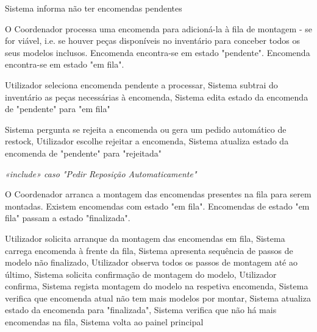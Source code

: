             {
                Sistema informa não ter encomendas pendentes
            }

            \newpage
                {O Coordenador processa uma encomenda para adicioná-la à fila de montagem - se for viável, i.e. se houver peças disponíveis no inventário para conceber todos os seus modelos inclusos.}
                {Encomenda encontra-se em estado "pendente".}
                {Encomenda encontra-se em estado "em fila".}

            {
                Utilizador seleciona encomenda pendente a processar,
                Sistema subtrai do inventário as peças necessárias à encomenda,
                Sistema edita estado da encomenda de "pendente" para "em fila"
            }

            {
                Sistema pergunta se rejeita a encomenda ou gera um pedido automático de restock,
                Utilizador escolhe rejeitar a encomenda,
                Sistema atualiza estado da encomenda de "pendente" para "rejeitada"
            }

            {
               \textit{«include» caso "Pedir Reposição Automaticamente"}
            }

            \newpage
                {O Coordenador arranca a montagem das encomendas presentes na fila para serem montadas.}
                {Existem encomendas com estado "em fila".}
                {Encomendas de estado "em fila" passam a estado "finalizada".}

            {
                Utilizador solicita arranque da montagem das encomendas em fila,
                Sistema carrega encomenda à frente da fila,
                Sistema apresenta sequência de passos de modelo não finalizado,
                Utilizador observa todos os passos de montagem até ao último,
                Sistema solicita confirmação de montagem do modelo,
                Utilizador confirma,
                Sistema regista montagem do modelo na respetiva encomenda,
                Sistema verifica que encomenda atual não tem mais modelos por montar,
                Sistema atualiza estado da encomenda para "finalizada",
                Sistema verifica que não há mais encomendas na fila,
                Sistema volta ao painel principal
            }

